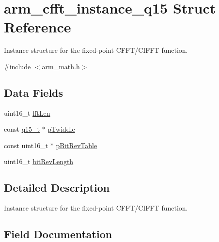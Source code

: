 \hypertarget{structarm__cfft__instance__q15}{}\section{arm\+\_\+cfft\+\_\+instance\+\_\+q15 Struct Reference}
\label{structarm__cfft__instance__q15}


Instance structure for the fixed-\/point C\+F\+F\+T/\+C\+I\+F\+FT function.  




{\ttfamily \#include $<$arm\+\_\+math.\+h$>$}

\subsection*{Data Fields}
\begin{DoxyCompactItemize}
\item 
uint16\+\_\+t \mbox{\hyperlink{structarm__cfft__instance__q15_ab8db3bbe7c61e6bb8ca2a55e3446e11a}{fft\+Len}}
\item 
const \mbox{\hyperlink{arm__math_8h_ab5a8fb21a5b3b983d5f54f31614052ea}{q15\+\_\+t}} $\ast$ \mbox{\hyperlink{structarm__cfft__instance__q15_a7f19217cfa0370f9e518caa882265386}{p\+Twiddle}}
\item 
const uint16\+\_\+t $\ast$ \mbox{\hyperlink{structarm__cfft__instance__q15_a3b229432d381b0a511a9cdbe3aa74e78}{p\+Bit\+Rev\+Table}}
\item 
uint16\+\_\+t \mbox{\hyperlink{structarm__cfft__instance__q15_a65e1b3e327b8fab9404287ed8f347cc8}{bit\+Rev\+Length}}
\end{DoxyCompactItemize}


\subsection{Detailed Description}
Instance structure for the fixed-\/point C\+F\+F\+T/\+C\+I\+F\+FT function. 

\subsection{Field Documentation}
\mbox{\label{structarm__cfft__instance__q15_a65e1b3e327b8fab9404287ed8f347cc8}} 
